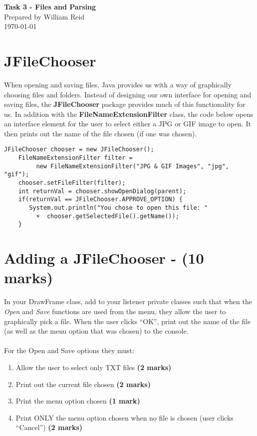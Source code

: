 \documentclass[a4paper,12pt]{article}
\begin{document}
\begin{center}
{\LARGE\bf Task 3 - Files and Parsing}\\
\vspace{0.5cm}
Prepared by William Reid\\
\today
\end{center}

\vspace{0.5cm}
\section{JFileChooser}
When opening and saving files, Java provides us with a way of graphically choosing files and folders. Instead of designing our own interface for opening and saving files, the {\bf JFileChooser} package provides much of this functionality for us. In addition with the {\bf FileNameExtensionFilter} class, the code below opens an interface element for the user to select either a JPG or GIF image to open. It then prints out the name of the file chosen (if one was chosen).

\begin{verbatim}
JFileChooser chooser = new JFileChooser();
    FileNameExtensionFilter filter =
    	 new FileNameExtensionFilter("JPG & GIF Images", "jpg", "gif");
    chooser.setFileFilter(filter);
    int returnVal = chooser.showOpenDialog(parent);
    if(returnVal == JFileChooser.APPROVE_OPTION) {
       System.out.println("You chose to open this file: "
       	 +  chooser.getSelectedFile().getName());
    }
\end{verbatim}
  

\section{Adding a JFileChooser - (10 marks)}
In your DrawFrame class, add to your listener private classes such that when the \textit{Open} and \textit{Save} functions are used from the menu, they allow the user to graphically pick a file. When the user clicks ``OK'', print out the name of the file (as well as the menu option that was chosen) to the console.\\
\\
For the Open and Save options they must:
\begin{enumerate}
\item Allow the user to select only TXT files {\bf (2 marks)}
\item Print out the current file chosen {\bf (2 marks)}
\item Print the menu option chosen {\bf (1 mark)}
\item Print ONLY the menu option chosen when no file is chosen (user clicks ``Cancel'') {\bf (2 marks)}
\end{enumerate}
\end{document}
